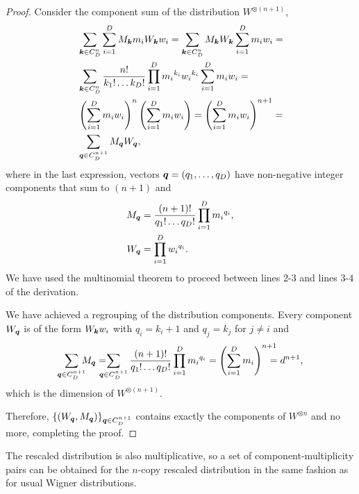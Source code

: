 \documentclass[pra,
aps,
twocolumn,
superscriptaddress,
groupedaddress,
nofootinbib,
reprint
]{revtex4-1}
\begin{document}
\begin{proof}
	Consider the component sum of the distribution $W^{\otimes (n+1)}$,
\begin{align*}
	&\sum_{\bm{k} \in C_D^n}\sum_{i=1}^D M_{\bm{k}} m_i W_{\bm{k}} w_i = \sum_{\bm{k} \in C_D^n} M_{\bm{k}}W_{\bm{k}} \sum_{i=1}^D m_i w_i =\\
	&\sum_{\bm{k} \in C_D^n} \frac{n!}{k_1!\dots k_D!} \prod\limits_{i=1}^D {m_i}^{k_i}{w_i}^{k_i} \sum_{i=1}^D m_i w_i =\\
	&\left( \sum_{i=1}^D m_i w_i \right)^n \left( \sum_{i=1}^D m_i w_i \right) = \left( \sum_{i=1}^D m_i w_i \right)^{n+1} =\\
	&\sum_{\bm{q} \in C_D^{n+1}} M_{\bm{q}}W_{\bm{q}},
\end{align*}
where in the last expression, vectors $\bm{q} = (q_1, \dots, q_D)$ have non-negative integer components that sum to $(n+1)$ and 
\begin{align*}
	M_{\bm{q}} &= \frac{(n+1)!}{q_1!\dots q_D!} \prod\limits_{i=1}^D {m_i}^{q_i},\\
	W_{\bm{q}} &= \prod\limits_{i=1}^D {w_i}^{q_i}.
\end{align*}
We have used the multinomial theorem to proceed between lines 2-3 and lines 3-4 of the derivation.

We have achieved a regrouping of the distribution components.
Every component $W_{\bm{q}}$ is of the form $W_{\bm{k}} w_i$ with $q_i = k_i + 1$ and $q_j = k_j$ for $j\neq i$ and 
\begin{align*}
	\sum_{\bmq \in C_D^{n+1}}  \hspace{-6pt} M_{\bmq} =  \hspace{-10pt} \sum_{\bmq \in C_D^{n+1}} \frac{(n+1)!}{q_1!\dots q_D!} \prod\limits_{i=1}^D {m_i}^{q_i} = 
	\left( \sum_{i=1}^D m_i \right)^{n+1} \hspace{-10pt} = d^{n+1},
\end{align*}
which is the dimension of $W^{\otimes (n+1)}$.

Therefore, $\{ (W_{\bm{q}}, M_{\bm{q}}) \}_{\bm{q} \in C_D^{n+1}}$ contains exactly the components of $W^{\otimes n}$ and no more, completing the proof.
\end{proof}

The rescaled distribution is also multiplicative, so a set of component-multiplicity pairs can be obtained for the $n$-copy rescaled distribution in the same fashion as for usual Wigner distributions.
\end{document}
